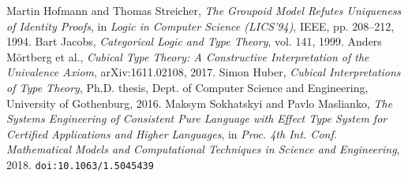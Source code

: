 \documentclass{article}
\begin{document}
\begin{thebibliography}{99}
 Martin Hofmann and Thomas Streicher, \textit{The Groupoid Model Refutes Uniqueness of Identity Proofs}, in \textit{Logic in Computer Science (LICS'94)}, IEEE, pp. 208–212, 1994.
 Bart Jacobs, \textit{Categorical Logic and Type Theory}, vol. 141, 1999.
 Anders Mörtberg et al., \textit{Cubical Type Theory: A Constructive Interpretation of the Univalence Axiom}, arXiv:1611.02108, 2017.
 Simon Huber, \textit{Cubical Interpretations of Type Theory}, Ph.D. thesis, Dept. of Computer Science and Engineering, University of Gothenburg, 2016.
 Maksym Sokhatskyi and Pavlo Maslianko, \textit{The Systems Engineering of Consistent Pure Language with Effect Type System for Certified Applications and Higher Languages}, in \textit{Proc. 4th Int. Conf. Mathematical Models and Computational Techniques in Science and Engineering}, 2018. \texttt{doi:10.1063/1.5045439}

\end{thebibliography}
\end{document}
